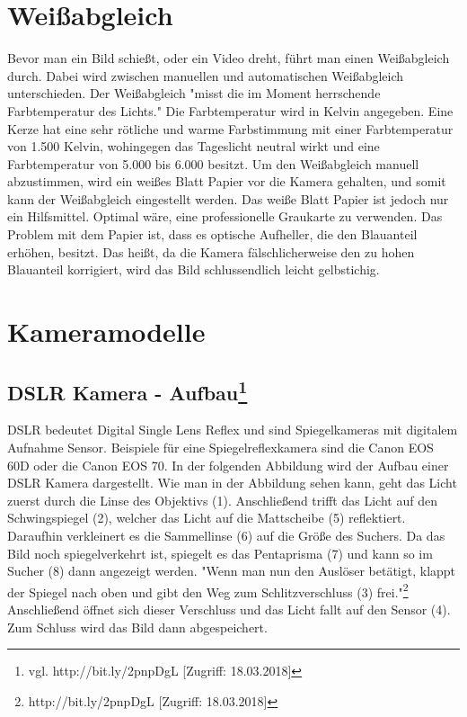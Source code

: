 \section{Weißabgleich}
Bevor man ein Bild schießt, oder ein Video dreht, führt man einen Weißabgleich durch. Dabei wird zwischen manuellen und automatischen Weißabgleich unterschieden. Der Weißabgleich "misst die im Moment herrschende Farbtemperatur des Lichts." Die Farbtemperatur wird in Kelvin angegeben. Eine Kerze hat eine sehr rötliche und warme Farbstimmung mit einer Farbtemperatur von 1.500 Kelvin, wohingegen das Tageslicht neutral wirkt und eine Farbtemperatur von 5.000 bis 6.000 besitzt. Um den Weißabgleich manuell abzustimmen, wird ein weißes Blatt Papier vor die Kamera gehalten, und somit kann der Weißabgleich eingestellt werden. Das weiße Blatt Papier ist jedoch nur ein Hilfsmittel. Optimal wäre, eine professionelle Graukarte zu verwenden. Das Problem mit dem Papier ist, dass es optische Aufheller, die den Blauanteil erhöhen, besitzt. Das heißt, da die Kamera fälschlicherweise den zu hohen Blauanteil korrigiert, wird das Bild schlussendlich leicht gelbstichig. 
\section{Kameramodelle}
\subsection[DSLR Kamera - Aufbau]{DSLR Kamera - Aufbau\protect\footnote{\label{}vgl. http://bit.ly/2pnpDgL [Zugriff: 18.03.2018]}}
DSLR bedeutet Digital Single Lens Reflex und sind Spiegelkameras mit digitalem Aufnahme Sensor. Beispiele für eine Spiegelreflexkamera sind die Canon EOS 60D oder die Canon EOS 70. In der folgenden Abbildung wird der Aufbau einer DSLR Kamera dargestellt. Wie man in der Abbildung sehen kann, geht das Licht zuerst durch die Linse des Objektivs (1). Anschließend trifft das Licht auf den Schwingspiegel (2), welcher das Licht auf die Mattscheibe (5) reflektiert. Daraufhin verkleinert es die Sammellinse (6) auf die Größe des Suchers. Da das Bild noch spiegelverkehrt ist, spiegelt es das Pentaprisma (7) und kann so im Sucher (8) dann angezeigt werden. "Wenn man nun den Auslöser betätigt, klappt der Spiegel nach oben und gibt den Weg zum Schlitzverschluss (3) frei."\footnote{\label{}http://bit.ly/2pnpDgL [Zugriff: 18.03.2018]} Anschließend öffnet sich dieser Verschluss und das Licht fallt auf den Sensor (4). Zum Schluss wird das Bild dann abgespeichert.
